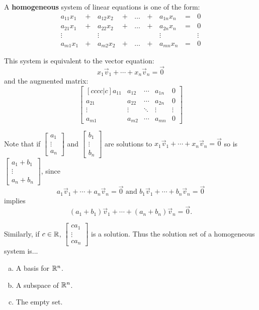 \begin{definition}
A \textbf{homogeneous} system of linear equations is one of the form:
  \begin{alignat*}{5}
    a_{11}x_1 &\,+\,& a_{12}x_2 &\,+\,& \dots  &\,+\,& a_{1n}x_n &\,=\,& 0 \\
    a_{21}x_1 &\,+\,& a_{22}x_2 &\,+\,& \dots  &\,+\,& a_{2n}x_n &\,=\,& 0 \\
     \vdots&  &\vdots&   &&  &\vdots&&\vdots  \\
    a_{m1}x_1 &\,+\,& a_{m2}x_2 &\,+\,& \dots  &\,+\,& a_{mn}x_n &\,=\,& 0
  \end{alignat*}

  This system is equivalent to the vector equation:
  \[x_1 \vec{v}_1 + \cdots+x_n \vec{v}_n = \vec{0}\]
  and the augmented matrix:
  \[
    \begin{bmatrix}[cccc|c]
      a_{11} & a_{12} & \cdots & a_{1n} & 0\\
      a_{21} & a_{22} & \cdots & a_{2n} & 0\\
      \vdots & \vdots & \ddots & \vdots & \vdots\\
      a_{m1} & a_{m2} & \cdots & a_{mn} & 0
    \end{bmatrix}
  \]
\end{definition}

\begin{activity}{5}
Note that if \(\begin{bmatrix} a_1 \\ \vdots \\ a_n \end{bmatrix} \) and
\(\begin{bmatrix} b_1 \\ \vdots \\ b_n \end{bmatrix} \) are solutions to
\(x_1 \vec{v}_1 + \cdots+x_n \vec{v}_n = \vec{0}\)
so is  \(\begin{bmatrix} a_1 +b_1\\ \vdots \\ a_n+b_n \end{bmatrix} \), since
\[a_1 \vec{v}_1+\cdots+a_n \vec{v}_n = \vec{0}
\text{ and }
b_1 \vec{v}_1+\cdots+b_n \vec{v}_n = \vec{0} \]
implies
\[(a_1 + b_1) \vec{v}_1+\cdots+(a_n+b_n) \vec{v}_n = \vec{0} .\]

Similarly, if \(c \in \mathbb{R}\), \(\begin{bmatrix} ca_1 \\ \vdots \\ ca_n \end{bmatrix} \) is a solution.
Thus the solution set of a homogeneous system is...
\begin{multicols}{3}
\begin{enumerate}[a)]
  \item A basis for \(\mathbb{R}^n\).
  \item A subspace of \(\mathbb{R}^n\).
  \item The empty set.
\end{enumerate}
\end{multicols}
\end{activity}

